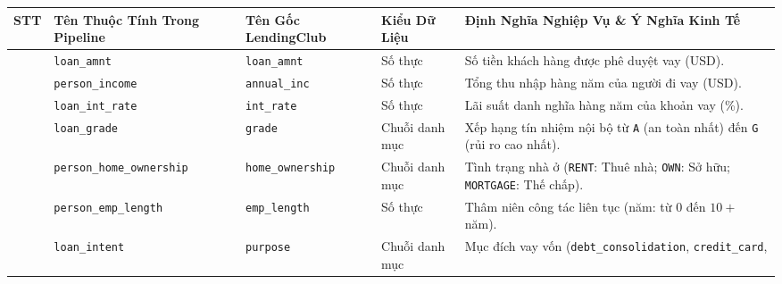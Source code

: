 \documentclass[
  13pt,
  a4paper,
]{report}
\newcounter{none} %
\begin{document}
{\def\LTcaptype{none} %
\begin{longtable}[]{@{}
  >{\centering\arraybackslash}p{}
  >{\raggedright\arraybackslash}p{}
  >{\raggedright\arraybackslash}p{}
  >{\centering\arraybackslash}p{}
  >{\raggedright\arraybackslash}p{}@{}}
\toprule\noalign{}
\begin{minipage}[b]{\linewidth}\centering
STT
\end{minipage} & \begin{minipage}[b]{\linewidth}\raggedright
Tên Thuộc Tính Trong Pipeline
\end{minipage} & \begin{minipage}[b]{\linewidth}\raggedright
Tên Gốc LendingClub
\end{minipage} & \begin{minipage}[b]{\linewidth}\centering
Kiểu Dữ Liệu
\end{minipage} & \begin{minipage}[b]{\linewidth}\raggedright
Định Nghĩa Nghiệp Vụ \& Ý Nghĩa Kinh Tế
\end{minipage} \\
\midrule\noalign{}
\endhead
\bottomrule\noalign{}
\endlastfoot
1 & \texttt{loan\_amnt} & \texttt{loan\_amnt} & Số thực & Số tiền khách
hàng được phê duyệt vay (USD). \\
2 & \texttt{person\_income} & \texttt{annual\_inc} & Số thực & Tổng thu
nhập hàng năm của người đi vay (USD). \\
3 & \texttt{loan\_int\_rate} & \texttt{int\_rate} & Số thực & Lãi suất
danh nghĩa hàng năm của khoản vay (\%). \\
4 & \texttt{loan\_grade} & \texttt{grade} & Chuỗi danh mục & Xếp hạng
tín nhiệm nội bộ từ \texttt{A} (an toàn nhất) đến \texttt{G} (rủi ro cao
nhất). \\
5 & \texttt{person\_home\_ownership} & \texttt{home\_ownership} & Chuỗi
danh mục & Tình trạng nhà ở (\texttt{RENT}: Thuê nhà; \texttt{OWN}: Sở
hữu; \texttt{MORTGAGE}: Thế chấp). \\
6 & \texttt{person\_emp\_length} & \texttt{emp\_length} & Số thực & Thâm
niên công tác liên tục (năm: từ \(0\) đến \(10+\) năm). \\
7 & \texttt{loan\_intent} & \texttt{purpose} & Chuỗi danh mục & Mục đích
vay vốn (\texttt{debt\_consolidation}, \texttt{credit\_card},

\end{longtable}}
\end{document}
